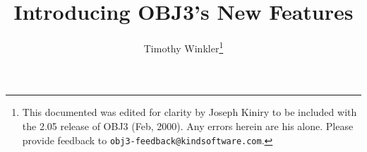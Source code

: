 


\newcommand{\nt}[1]{\mbox{$\langle\!\!\!$ {\it {#1}} $\!\!\rangle$}}
\newcommand{\alt}{$\mid$}
\newcommand{\lopt}{$[$}
\newcommand{\ropt}{$]$}
\newcommand{\lsg}{\{}
\newcommand{\rsg}{\}}
\newcommand{\itr}{$\ldots$}
\newcommand{\itd}{$\ldots$}
\newcommand{\omt}{$\ldots\ldots\ldots$}

\newcommand{\noi}{\noindent}

\def\newblock{}

\setlength{\oddsidemargin}{-.15in}
\setlength{\textwidth}{6in} %
\setlength{\textheight}{8.5in} %
\setlength{\headsep}{-.5in}


\setlength{\oddsidemargin}{.2in}
\setlength{\textwidth}{6in} %
\setlength{\textheight}{8.5in} %
\setlength{\topmargin}{-.05in} %
\setlength{\headsep}{-.05in}

\makeatletter
\makeatother






\title{\vspace{-.75in}Introducing OBJ3's New Features}

\author{Timothy Winkler\footnote{This documented was edited for
    clarity by Joseph Kiniry to be included with the 2.05 release of
    OBJ3 (Feb, 2000).  Any errors herein are his alone.  Please
    provide feedback to {\tt obj3-feedback@kindsoftware.com}.}}

\maketitle

